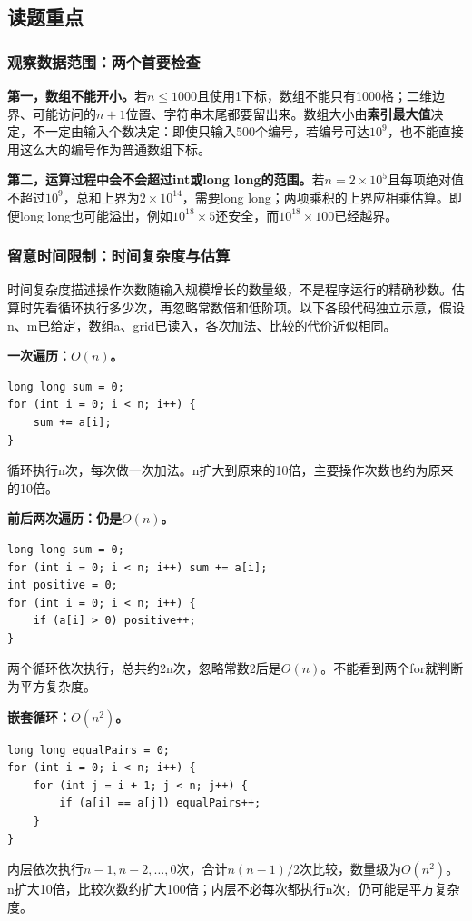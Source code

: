 \subsection{读题重点}
\subsubsection{观察数据范围：两个首要检查}
\textbf{第一，数组不能开小。}若$n\le1000$且使用1下标，数组不能只有1000格；二维边界、可能访问的$n+1$位置、字符串末尾都要留出来。数组大小由\textbf{索引最大值}决定，不一定由输入个数决定：即使只输入500个编号，若编号可达$10^9$，也不能直接用这么大的编号作为普通数组下标。

\textbf{第二，运算过程中会不会超过int或long long的范围。}若$n=2\times10^5$且每项绝对值不超过$10^9$，总和上界为$2\times10^{14}$，需要long long；两项乘积的上界应相乘估算。即便long long也可能溢出，例如$10^{18}\times5$还安全，而$10^{18}\times100$已经越界。
\subsubsection{留意时间限制：时间复杂度与估算}
时间复杂度描述操作次数随输入规模增长的数量级，不是程序运行的精确秒数。估算时先看循环执行多少次，再忽略常数倍和低阶项。以下各段代码独立示意，假设n、m已给定，数组a、grid已读入，各次加法、比较的代价近似相同。

\textbf{一次遍历：$O(n)$。}
\begin{lstlisting}
long long sum = 0;
for (int i = 0; i < n; i++) {
    sum += a[i];
}
\end{lstlisting}
循环执行n次，每次做一次加法。n扩大到原来的10倍，主要操作次数也约为原来的10倍。

\textbf{前后两次遍历：仍是$O(n)$。}
\begin{lstlisting}
long long sum = 0;
for (int i = 0; i < n; i++) sum += a[i];
int positive = 0;
for (int i = 0; i < n; i++) {
    if (a[i] > 0) positive++;
}
\end{lstlisting}
两个循环依次执行，总共约2n次，忽略常数2后是$O(n)$。不能看到两个for就判断为平方复杂度。

\textbf{嵌套循环：$O(n^2)$。}
\begin{lstlisting}
long long equalPairs = 0;
for (int i = 0; i < n; i++) {
    for (int j = i + 1; j < n; j++) {
        if (a[i] == a[j]) equalPairs++;
    }
}
\end{lstlisting}
内层依次执行$n-1,n-2,\ldots,0$次，合计$n(n-1)/2$次比较，数量级为$O(n^2)$。n扩大10倍，比较次数约扩大100倍；内层不必每次都执行n次，仍可能是平方复杂度。

